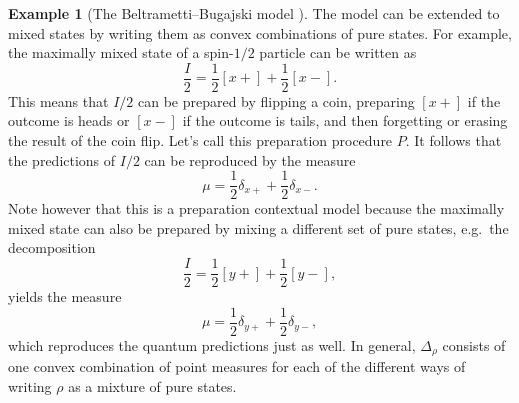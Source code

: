 \documentclass[DIV=calc,paper=a4,fontsize=11pt,twocolumn]{scrartcl} %
\theoremstyle{definition}
\newtheorem{example}[definition]{Example}
\theoremstyle{plain}
\newcommand{\Proj}[1]{\ensuremath{\left [ #1 \right ]}}
\begin{document}
\begin{example}[The Beltrametti--Bugajski model \cite{Beltrametti1995}]
The model can be extended to mixed states by writing them as convex
combinations of pure states.  For example, the maximally mixed state
of a spin-$1/2$ particle can be written as
\begin{equation}
\frac{I}{2} = \frac{1}{2} \Proj{x+} + \frac{1}{2} \Proj{x-}.
\end{equation}
This means that $I/2$ can be prepared by flipping a coin, preparing
$\Proj{x+}$ if the outcome is heads or $\Proj{x-}$ if the outcome is
tails, and then forgetting or erasing the result of the coin flip.
Let's call this preparation procedure $P$.  It follows that the
predictions of $I/2$ can be reproduced by the measure
\begin{equation}
\mu = \frac{1}{2}\delta_{x+} + \frac{1}{2}\delta_{x-}.
\end{equation}
Note however that this is a preparation contextual model because the
maximally mixed state can also be prepared by mixing a different set
of pure states, e.g.\ the decomposition
\begin{equation}
\frac{I}{2} = \frac{1}{2} \Proj{y+} + \frac{1}{2} \Proj{y-},
\end{equation}
yields the measure
\begin{equation}
\mu = \frac{1}{2}\delta_{y+} + \frac{1}{2}\delta_{y-},
\end{equation}
which reproduces the quantum predictions just as well.  In general,
$\Delta_{\rho}$ consists of one convex combination of point measures
for each of the different ways of writing $\rho$ as a mixture of
pure states.
\end{example}
\end{document}
